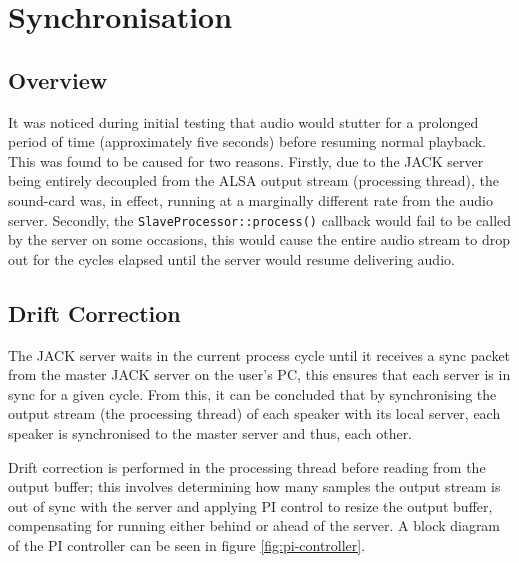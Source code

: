 \documentclass[main.tex]{subfiles}
\begin{document}
\pagebreak

\section{Synchronisation}
\subsection{Overview}
It was noticed during initial testing that audio would stutter for a prolonged period of time (approximately five seconds) before resuming normal playback.
This was found to be caused for two reasons.
Firstly, due to the JACK server being entirely decoupled from the ALSA output stream (processing thread), the sound-card was, in effect, running at a marginally different rate from the audio server.
Secondly, the \lstinline{SlaveProcessor::process()} callback would fail to be called by the server on some occasions, this would cause the entire audio stream to drop out for the cycles elapsed until the server would resume delivering audio.

\subsection{Drift Correction}
\medskip
The JACK server waits in the current process cycle until it receives a sync packet from the master JACK server on the user's PC, this ensures that each server is in sync for a given cycle.
From this, it can be concluded that by synchronising the output stream (the processing thread) of each speaker with its local server, each speaker is synchronised to the master server and thus, each other.

\medskip
Drift correction is performed in the processing thread before reading from the output buffer;
this involves determining how many samples the output stream is out of sync with the server and applying PI control to resize the output buffer, compensating for running either behind or ahead of the server.
A block diagram of the PI controller can be seen in figure \ref{fig:pi-controller}.
\end{document}
